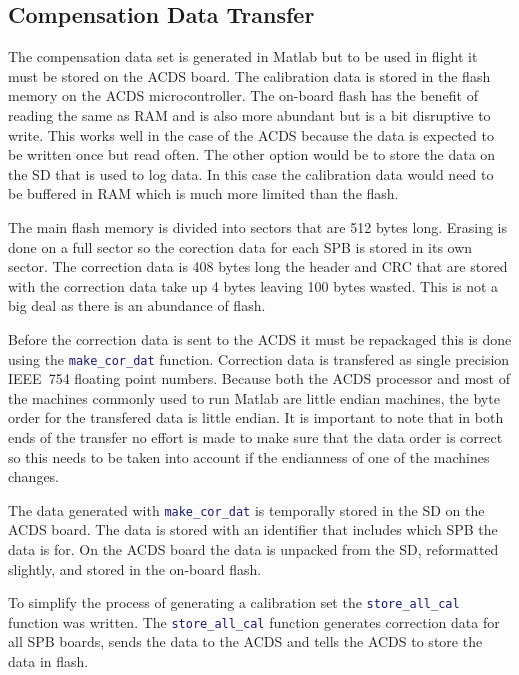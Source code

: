 \subsection{Compensation Data Transfer}

The compensation data set is generated in Matlab but to be used in flight it must be stored on the \ac{ACDS} board. The calibration data is stored in the flash memory on the \ac{ACDS} microcontroller. The on-board flash has the benefit of reading the same as \ac{RAM} and is also more abundant but is a bit disruptive to write. This works well in the case of the \ac{ACDS} because the data is expected to be written once but read often. The other option would be to store the data on the \ac{SD} that is used to log data. In this case the calibration data would need to be buffered in \ac{RAM} which is much more limited than the flash. 

The main flash memory is divided into sectors that are 512 bytes long. Erasing is done on a full sector so the corection data for each \ac{SPB} is stored in its own sector. The correction data is 408 bytes long the header and \ac{CRC} that are stored with the correction data take up 4 bytes leaving 100 bytes wasted. This is not a big deal as there is an abundance of flash.

Before the correction data is sent to the \ac{ACDS} it must be repackaged this is done using the \lstinline[style=code,language=Matlab]$make_cor_dat$ function. Correction data is transfered as single precision IEEE~754 floating point numbers. Because both the \ac{ACDS} processor and most of the machines commonly used to run Matlab are little endian machines, the byte order for the transfered data is little endian. It is important to note that in both ends of the transfer no effort is made to make sure that the data order is correct so this needs to be taken into account if the endianness of one of the machines changes.

The data generated with \lstinline[style=code,language=Matlab]$make_cor_dat$ is temporally stored in the \ac{SD} on the \ac{ACDS} board. The data is stored with an identifier that includes which \ac{SPB} the data is for. On the \ac{ACDS} board the data is unpacked from the \ac{SD}, reformatted slightly, and stored in the on-board flash. 

To simplify the process of generating a calibration set the \lstinline[style=code,language=Matlab]$store_all_cal$ function was written. The \lstinline[style=code,language=Matlab]$store_all_cal$ function generates correction data for all \ac{SPB} boards, sends the data to the \ac{ACDS} and tells the \ac{ACDS} to store the data in flash. 

